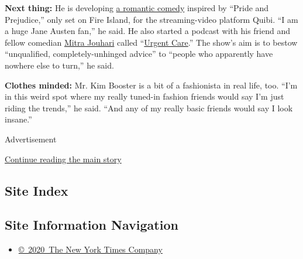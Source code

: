 \textbf{Next thing:} He is developing
\href{https://deadline.com/2019/09/fire-island-comedy-series-trip-from-joel-kim-booster-jax-media-in-works-at-quibi-1202744032/}{a
romantic comedy} inspired by ``Pride and Prejudice,'' only set on Fire
Island, for the streaming-video platform Quibi. ``I am a huge Jane
Austen fan,'' he said. He also started a podcast with his friend and
fellow comedian \href{https://www.mitrajouhari.biz}{Mitra Jouhari}
called
``\href{https://podcasts.apple.com/us/podcast/urgent-care-with-joel-kim-booster-mitra-jouhari/id1483879124}{Urgent
Care}.'' The show's aim is to bestow ``unqualified, completely-unhinged
advice'' to ``people who apparently have nowhere else to turn,'' he
said.

\textbf{Clothes minded:} Mr. Kim Booster is a bit of a fashionista in
real life, too. ``I'm in this weird spot where my really tuned-in
fashion friends would say I'm just riding the trends,'' he said. ``And
any of my really basic friends would say I look insane.''

Advertisement

\protect\hyperlink{after-bottom}{Continue reading the main story}

\hypertarget{site-index}{%
\subsection{Site Index}\label{site-index}}

\hypertarget{site-information-navigation}{%
\subsection{Site Information
Navigation}\label{site-information-navigation}}

\begin{itemize}
\tightlist
\item
  \href{https://help.nytimes.com/hc/en-us/articles/115014792127-Copyright-notice}{©~2020~The
  New York Times Company}
\end{itemize}

